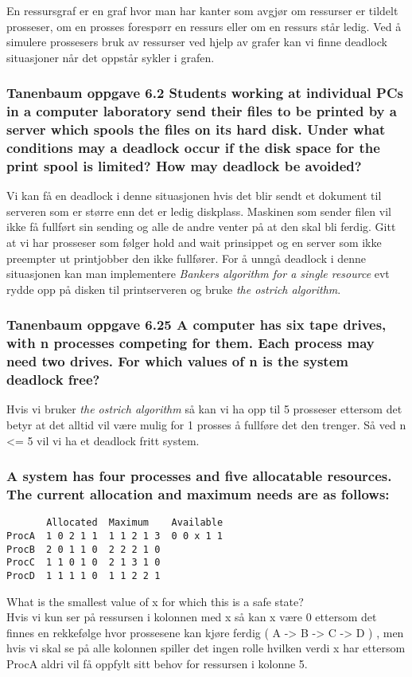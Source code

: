 \documentclass[9pt]{article}
\begin{document}
En ressursgraf er en graf hvor man har kanter som avgjør om ressurser er tildelt prosseser, om en prosses forespørr en ressurs eller om en ressurs står ledig. Ved å simulere prossesers bruk av ressurser ved hjelp av grafer kan vi finne deadlock situasjoner når det oppstår sykler i grafen. 

\subsubsection{Tanenbaum oppgave 6.2 Students working at individual PCs in a computer laboratory send their files to be printed by a server which spools the files on its hard disk. Under what conditions may a deadlock occur if the disk space for the print spool is limited? How may deadlock be avoided?}

Vi kan få en deadlock i denne situasjonen hvis det blir sendt et dokument til serveren som er større enn det er ledig diskplass. Maskinen som sender filen vil ikke få fullført sin sending og alle de andre venter på at den skal bli ferdig. Gitt at vi har prosseser som følger hold and wait prinsippet og en server som ikke preempter ut printjobber den ikke fullfører. For å unngå deadlock i denne situasjonen kan man implementere \textit{Bankers algorithm for a single resource} evt rydde opp på disken til printserveren og bruke \textit{the ostrich algorithm}.

\subsubsection{Tanenbaum oppgave 6.25 A computer has six tape drives, with n processes competing for them. Each process may need two drives. For which values of n is the system deadlock free?}

Hvis vi bruker \textit{the ostrich algorithm} så kan vi ha opp til 5 prosseser ettersom det betyr at det alltid vil være mulig for 1 prosses å fullføre det den trenger. Så ved n <= 5 vil vi ha et deadlock fritt system.

\subsubsection{A system has four processes and five allocatable resources. The current allocation and maximum needs are as follows: }
\begin{verbatim}
       Allocated  Maximum    Available
ProcA  1 0 2 1 1  1 1 2 1 3  0 0 x 1 1
ProcB  2 0 1 1 0  2 2 2 1 0
ProcC  1 1 0 1 0  2 1 3 1 0
ProcD  1 1 1 1 0  1 1 2 2 1
\end{verbatim}
What is the smallest value of x for which this is a safe state? \\
Hvis vi kun ser på ressursen i kolonnen med x så kan x være 0 ettersom det finnes en rekkefølge hvor prossesene kan kjøre ferdig ( A -> B -> C -> D ) , men hvis vi skal se på alle kolonnen spiller det ingen rolle hvilken verdi x har ettersom ProcA aldri vil få oppfylt sitt behov for ressursen i kolonne 5.
\end{document}
